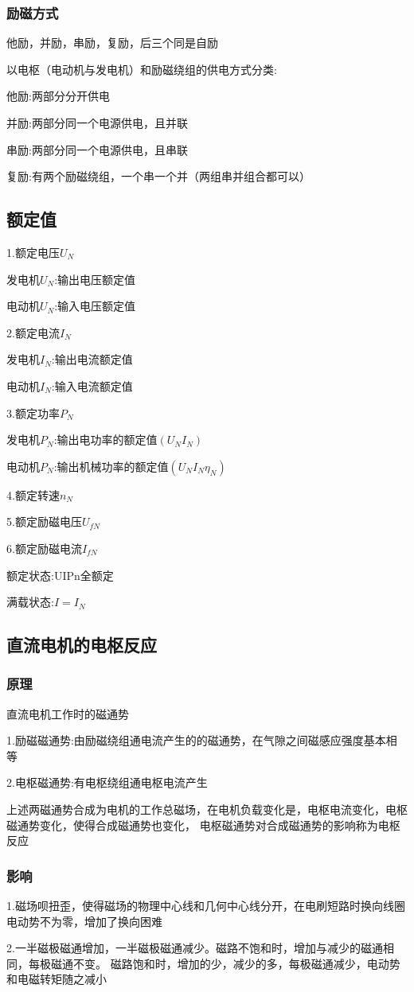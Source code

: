 \documentclass[11pt,twoside,a4paper]{ctexart}
\begin{document}
    \subsubsection{励磁方式}
    他励，并励，串励，复励，后三个同是自励

    以电枢（电动机与发电机）和励磁绕组的供电方式分类:

    他励:两部分分开供电

    并励:两部分同一个电源供电，且并联

    串励:两部分同一个电源供电，且串联

    复励:有两个励磁绕组，一个串一个并（两组串并组合都可以）

    \subsection{额定值}
    1.额定电压$U_N$
    
    发电机$U_N$:输出电压额定值

    电动机$U_N$:输入电压额定值

    2.额定电流$I_N$

    发电机$I_N$:输出电流额定值

    电动机$I_N$:输入电流额定值

    3.额定功率$P_N$

    发电机$P_N$:输出电功率的额定值$(U_NI_N)$

    电动机$P_N$:输出机械功率的额定值$(U_NI_N\eta _N)$

    4.额定转速$n_N$

    5.额定励磁电压$U_{fN}$

    6.额定励磁电流$I_{fN}$

    额定状态:UIPn全额定

    满载状态:$I = I_N$

    \subsection{直流电机的电枢反应}
    \subsubsection{原理}
    直流电机工作时的磁通势

    1.励磁磁通势:由励磁绕组通电流产生的的磁通势，在气隙之间磁感应强度基本相等

    2.电枢磁通势:有电枢绕组通电枢电流产生

    上述两磁通势合成为电机的工作总磁场，在电机负载变化是，电枢电流变化，电枢磁通势变化，使得合成磁通势也变化，
    电枢磁通势对合成磁通势的影响称为电枢反应
    \subsubsection{影响}
    1.磁场呗扭歪，使得磁场的物理中心线和几何中心线分开，在电刷短路时换向线圈
    电动势不为零，增加了换向困难

    2.一半磁极磁通增加，一半磁极磁通减少。磁路不饱和时，增加与减少的磁通相同，每极磁通不变。
    磁路饱和时，增加的少，减少的多，每极磁通减少，电动势和电磁转矩随之减小
\end{document}
